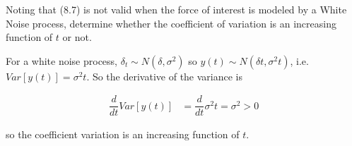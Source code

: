 \documentclass{article}
\numberwithin{questioncounter}{section}
\begin{document}
\begin{question}
Noting that (8.7) is not valid when the force of interest is modeled by a White Noise process, determine whether the coefficient of variation is an increasing function of $t$ or not.
\end{question}

\begin{solution}
For a white noise process, $\delta_{t} \sim N(\delta, \sigma^{2})$ so $y(t) \sim N(\delta t, \sigma^{2} t)$, i.e. $Var[y(t)] = \sigma^{2} t$. So the derivative of the variance is

\begin{align*}
\dfrac{d}{dt} Var[y(t)] &= \dfrac{d}{dt} \sigma^{2} t = \sigma^{2} > 0
\end{align*}

so the coefficient variation is an increasing function of $t$.

\end{solution}
\end{document}

